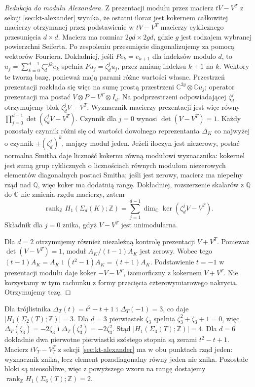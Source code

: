 \begin{proof}[Redukcja do modułu Alexandera]
Z prezentacji modułu przez macierz $tV-V^T$
z sekcji \ref{sec:kt-alexander} wynika, że ostatni iloraz jest kokernem całkowitej
macierzy otrzymanej przez podstawienie w $tV-V^T$
macierzy cyklicznego przesunięcia $d\times d$.
Macierz ma rozmiar $2gd\times2gd$, gdzie $g$
jest rodzajem wybranej powierzchni Seiferta.
Po zespoleniu przesunięcie diagonalizujemy
za pomocą wektorów Fouriera. Dokładniej, jeśli
$P e_k=e_{k+1}$ dla indeksów modulo $d$, to
$u_j=\sum_{k=0}^{d-1}\zeta_d^{-jk}e_k$ spełnia
$Pu_j=\zeta_d^j u_j$, przez zmianę indeksu
$k+1$ na $k$. Wektory te tworzą bazę, ponieważ
mają parami różne wartości własne.
Przestrzeń prezentacji rozkłada się więc na
sumę prostą przestrzeni
$\mathbb C^{2g}\otimes\mathbb C u_j$;
operator prezentacji ma postać
$V\otimes P-V^T\otimes I_d$. Na podprzestrzeni
odpowiadającej $\zeta_d^j$ otrzymujemy blok
$\zeta_d^j V-V^T$. Wyznacznik
macierzy prezentacji jest więc równy
$\prod_{j=0}^{d-1}\det(\zeta_d^jV-V^T)$.
Czynnik dla $j=0$ wynosi $\det(V-V^T)=1$.
Każdy pozostały czynnik różni się od wartości
dowolnego reprezentanta $\Delta_K$ co najwyżej
o czynnik $\pm(\zeta_d^j)^k$, mający moduł jeden.
Jeżeli iloczyn jest niezerowy, postać normalna
Smitha daje liczność kokernu równą modułowi
wyznacznika: kokernel jest sumą grup cyklicznych
o licznościach równych modułom niezerowych
elementów diagonalnych postaci Smitha;
jeśli jest zerowy, macierz ma niepełny rząd nad
$\mathbb Q$, więc koker ma dodatnią rangę.
Dokładniej, rozszerzenie skalarów z $\mathbb Q$
do $\mathbb C$ nie zmienia rzędu macierzy, zatem
\[
\operatorname{rank}_{\mathbb Z}H_1(\Sigma_d(K);\mathbb Z)
=\sum_{j=1}^{d-1}\dim_{\mathbb C}\ker(\zeta_d^j V-V^T).
\]
Składnik dla $j=0$ znika, gdyż $V-V^T$ jest
unimodularna.

Dla $d=2$ otrzymujemy również niezależną kontrolę
prezentacji $V+V^T$. Ponieważ $\det(V-V^T)=1$,
moduł $A_K/(t-1)A_K$ jest zerowy. Wobec tego
$(t-1)A_K=A_K$ i
$(t^2-1)A_K=(t+1)A_K$. Podstawienie $t=-1$
w prezentacji modułu daje koker $-V-V^T$,
izomorficzny z kokernem $V+V^T$.
Nie korzystamy w tym rachunku z formy przecięcia
czterowymiarowego nakrycia. Otrzymujemy tezę.
\end{proof}

\begin{przyklad}
Dla trójlistnika $\Delta_T(t)=t^2-t+1$ i
$\Delta_T(-1)=3$, co daje
$|H_1(\Sigma_2(T);\mathbb Z)|=3$.
Dla $d=3$ pierwiastek $\zeta_3$ spełnia
$\zeta_3^2+\zeta_3+1=0$, więc
$\Delta_T(\zeta_3)=-2\zeta_3$ i
$\Delta_T(\zeta_3^2)=-2\zeta_3^2$.
Stąd $|H_1(\Sigma_3(T);\mathbb Z)|=4$.
Dla $d=6$ dokładnie dwa pierwotne pierwiastki
szóstego stopnia są zerami $t^2-t+1$.
Macierz $tV_T-V_T^T$ z sekcji \ref{sec:kt-alexander}
ma w obu punktach rząd jeden: wyznacznik znika,
lecz element pozadiagonalny równy jeden nie znika.
Pozostałe bloki są nieosobliwe, więc z powyższego
wzoru na rangę dostajemy
$\operatorname{rank}_{\mathbb Z}H_1(\Sigma_6(T);\mathbb Z)=2$.
\end{przyklad}

